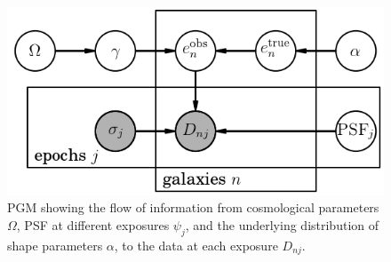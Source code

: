 \documentclass[12pt]{article}
\newcommand{\data}{D}
\newcommand{\psf}{\psi}
\begin{document}
\begin{figure}[!htb]
  \includegraphics[width=\linewidth]{weaklensing1.png}
\endminipage
\caption{PGM showing the flow of information
from cosmological parameters $\Omega$, PSF at different
exposures $\psf_j$, and 
the underlying distribution of shape parameters 
$\alpha$, to the data at each exposure $\data_{nj}$.\label{3}}
\end{figure}
\end{document}
